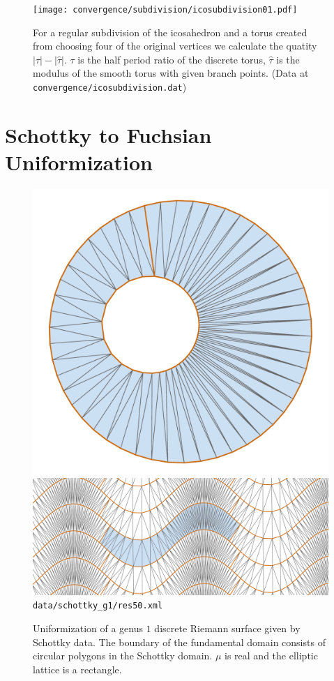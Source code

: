 \documentclass[Thesis.tex]{subfiles}
\begin{document}
\begin{figure}[h]
\centering
\texttt{[image: convergence/subdivision/icosubdivision01.pdf]}
\caption{For a regular subdivision of the icosahedron and a torus created from choosing
four of the original vertices we calculate the quatity $|\tau|-|\hat\tau|$. $\tau$ is the 
half period ratio of the discrete torus, $\hat\tau$ is the modulus of the smooth torus
with given branch points. (Data at {\tt convergence/icosubdivision.dat})}
\label{fig:convergence_subdivision}
\end{figure}




\section{Schottky to Fuchsian Uniformization}
\label{sec:schottky_examples}

\begin{figure} \centering
\includegraphics[width=0.28\linewidth]{data/schottky_g1/res50_image} \quad
\includegraphics[width=0.68\linewidth]{data/schottky_g1/res50_cover}
{\scriptsize\tt data/schottky\_g1/res50.xml} 
\caption{Uniformization of a genus $1$ discrete Riemann surface given by
Schottky data.  The boundary of the fundamental domain consists of circular
polygons in the Schottky domain.  $\mu$ is real and the elliptic lattice is a
rectangle.} 
\label{fig:fuchsian_to_schottky_genus1} 
\end{figure}
\end{document}
